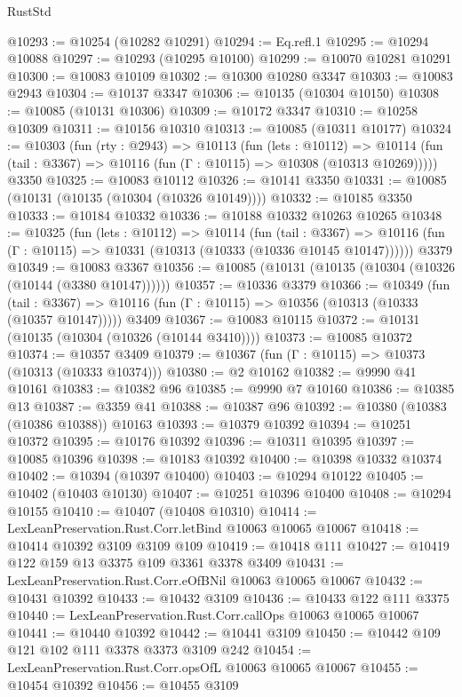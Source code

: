 \begin{lexlean}{RustStd}
\begin{coremodule}
@10293 := @10254 (@10282 @10291)
@10294 := Eq.refl.{1}
@10295 := @10294 @10088
@10297 := @10293 (@10295 @10100)
@10299 := @10070 @10281 @10291
@10300 := @10083 @10109
@10302 := @10300 @10280 @3347
@10303 := @10083 @2943
@10304 := @10137 @3347
@10306 := @10135 (@10304 @10150)
@10308 := @10085 (@10131 @10306)
@10309 := @10172 @3347
@10310 := @10258 @10309
@10311 := @10156 @10310
@10313 := @10085 (@10311 @10177)
@10324 := @10303
    (fun (rty : @2943) =>
    @10113
      (fun (lets : @10112) =>
      @10114 (fun (tail : @3367) => @10116 (fun (Γ : @10115) => @10308 (@10313 @10269)))))
    @3350
@10325 := @10083 @10112
@10326 := @10141 @3350
@10331 := @10085 (@10131 (@10135 (@10304 (@10326 @10149))))
@10332 := @10185 @3350
@10333 := @10184 @10332
@10336 := @10188 @10332 @10263 @10265
@10348 := @10325
    (fun (lets : @10112) =>
    @10114
      (fun (tail : @3367) =>
      @10116 (fun (Γ : @10115) => @10331 (@10313 (@10333 (@10336 @10145 @10147))))))
    @3379
@10349 := @10083 @3367
@10356 := @10085 (@10131 (@10135 (@10304 (@10326 (@10144 (@3380 @10147))))))
@10357 := @10336 @3379
@10366 := @10349
    (fun (tail : @3367) => @10116 (fun (Γ : @10115) => @10356 (@10313 (@10333 (@10357 @10147)))))
    @3409
@10367 := @10083 @10115
@10372 := @10131 (@10135 (@10304 (@10326 (@10144 @3410))))
@10373 := @10085 @10372
@10374 := @10357 @3409
@10379 := @10367 (fun (Γ : @10115) => @10373 (@10313 (@10333 @10374)))
@10380 := @2 @10162
@10382 := @9990 @41 @10161
@10383 := @10382 @96
@10385 := @9990 @7 @10160
@10386 := @10385 @13
@10387 := @3359 @41
@10388 := @10387 @96
@10392 := @10380 (@10383 (@10386 @10388)) @10163
@10393 := @10379 @10392
@10394 := @10251 @10372
@10395 := @10176 @10392
@10396 := @10311 @10395
@10397 := @10085 @10396
@10398 := @10183 @10392
@10400 := @10398 @10332 @10374
@10402 := @10394 (@10397 @10400)
@10403 := @10294 @10122
@10405 := @10402 (@10403 @10130)
@10407 := @10251 @10396 @10400
@10408 := @10294 @10155
@10410 := @10407 (@10408 @10310)
@10414 := LexLeanPreservation.Rust.Corr.letBind @10063 @10065 @10067
@10418 := @10414 @10392 @3109 @3109 @109
@10419 := @10418 @111
@10427 := @10419 @122 @159 @13 @3375 @109 @3361 @3378 @3409
@10431 := LexLeanPreservation.Rust.Corr.eOfBNil @10063 @10065 @10067
@10432 := @10431 @10392
@10433 := @10432 @3109
@10436 := @10433 @122 @111 @3375
@10440 := LexLeanPreservation.Rust.Corr.callOps @10063 @10065 @10067
@10441 := @10440 @10392
@10442 := @10441 @3109
@10450 := @10442 @109 @121 @102 @111 @3378 @3373 @3109 @242
@10454 := LexLeanPreservation.Rust.Corr.opsOfL @10063 @10065 @10067
@10455 := @10454 @10392
@10456 := @10455 @3109

\end{coremodule}
\end{lexlean}
